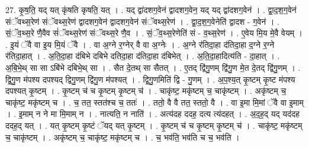 \documentclass[17pt]{extarticle}
\begin{document}
27. कृ॒ष॒ति॒ यद् यत् कृ॑षति कृषति॒ यत् । . यद् द्वा॑दशग॒वेन॑ द्वादशग॒वेन॒ यद् यद् द्वा॑दशग॒वेन॑ । . द्वा॒द॒श॒ग॒वेन॑ संॅवथ्स॒रेण॑ संॅवथ्स॒रेण॑ द्वादशग॒वेन॑ द्वादशग॒वेन॑ संॅवथ्स॒रेण॑ । . द्वा॒द॒श॒ग॒वेनेति॑ द्वादश - ग॒वेन॑ । . सं॒ॅव॒थ्स॒रे णै॒वैव सं॑ॅवथ्स॒रेण॑ संॅवथ्स॒रे णै॒व । . सं॒ॅव॒थ्स॒रेणेति॑ सं - व॒थ्स॒रेण॑ । . ए॒वेय मि॒य मे॒वै वेयम् । . इ॒यं ॅवै वा इ॒य मि॒यं ॅवै । . वा अ॒ग्ने र॒ग्नेर् वै वा अ॒ग्नेः । . अ॒ग्ने र॑तिदा॒हा द॑तिदा॒हा द॒ग्ने र॒ग्ने र॑तिदा॒हात् । . अ॒ति॒दा॒हा द॑बिभे दबिभे दतिदा॒हा द॑तिदा॒हा द॑बिभेत् । . अ॒ति॒दा॒हादित्य॑ति - दा॒हात् । . अ॒बि॒भे॒थ् सा सा ऽबि॑भे दबिभे॒थ् सा । . सैत दे॒तथ् सा सैतत् । . ए॒तद् द्वि॑गु॒णम् द्वि॑गु॒ण मे॒त दे॒तद् द्वि॑गु॒णम् । . द्वि॒गु॒ण म॑पश्य दपश्यद् द्विगु॒णम् द्वि॑गु॒ण म॑पश्यत् । . द्वि॒गु॒णमिति॑ द्वि - गु॒णम् । . अ॒प॒श्य॒त् कृ॒ष्टम् कृ॒ष्ट म॑पश्य दपश्यत् कृ॒ष्टम् । . कृ॒ष्टम् च॑ च कृ॒ष्टम् कृ॒ष्टम् च॑ । . चाकृ॑ष्ट॒ मकृ॑ष्टम् च॒ चाकृ॑ष्टम् । . अकृ॑ष्टम् च॒ चाकृ॑ष्ट॒ मकृ॑ष्टम् च । . च॒ तत॒ स्तत॑श्च च॒ ततः॑ । . ततो॒ वै वै तत॒ स्ततो॒ वै । . वा इ॒मा मि॒मां ॅवै वा इ॒माम् । . इ॒माम् न ने मा मि॒माम् न । . नात्यति॒ न नाति॑ । . अत्य॑दह ददह॒ दत्य त्य॑दहत् । . अ॒द॒ह॒द् यद् यद॑दह ददह॒द् यत् । . यत् कृ॒ष्टम् कृ॒ष्टं ॅयद् यत् कृ॒ष्टम् । . कृ॒ष्टम् च॑ च कृ॒ष्टम् कृ॒ष्टम् च॑ । . चाकृ॑ष्ट॒ मकृ॑ष्टम् च॒ चाकृ॑ष्टम् । . अकृ॑ष्टम् च॒ चाकृ॑ष्ट॒ मकृ॑ष्टम् च । . च॒ भव॑ति॒ भव॑ति च च॒ भव॑ति । \newline
\end{document}
